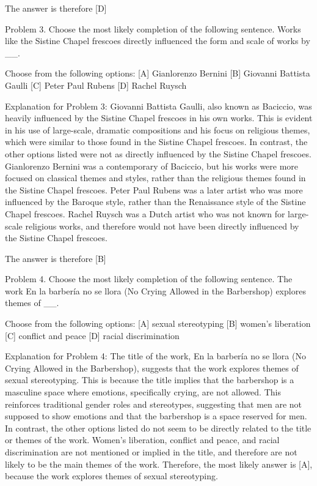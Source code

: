\documentclass{article}
\begin{document}
\begin{monobox}
The answer is therefore [D]

Problem 3.
Choose the most likely completion of the following sentence. Works like the Sistine Chapel frescoes directly influenced the form and scale of works by \_\_.

Choose from the following options:
[A] Gianlorenzo Bernini
[B] Giovanni Battista Gaulli
[C] Peter Paul Rubens
[D] Rachel Ruysch

Explanation for Problem 3: Giovanni Battista Gaulli, also known as Baciccio, was heavily influenced by the Sistine Chapel frescoes in his own works. This is evident in his use of large-scale, dramatic compositions and his focus on religious themes, which were similar to those found in the Sistine Chapel frescoes. In contrast, the other options listed were not as directly influenced by the Sistine Chapel frescoes. Gianlorenzo Bernini was a contemporary of Baciccio, but his works were more focused on classical themes and styles, rather than the religious themes found in the Sistine Chapel frescoes. Peter Paul Rubens was a later artist who was more influenced by the Baroque style, rather than the Renaissance style of the Sistine Chapel frescoes. Rachel Ruysch was a Dutch artist who was not known for large-scale religious works, and therefore would not have been directly influenced by the Sistine Chapel frescoes.

The answer is therefore [B]

Problem 4.
Choose the most likely completion of the following sentence. The work En la barber\'ia no se llora (No Crying Allowed in the Barbershop) explores themes of \_\_.

Choose from the following options:
[A] sexual stereotyping
[B] women's liberation
[C] conflict and peace
[D] racial discrimination

Explanation for Problem 4: The title of the work, En la barber\'ia no se llora (No Crying Allowed in the Barbershop), suggests that the work explores themes of sexual stereotyping. This is because the title implies that the barbershop is a masculine space where emotions, specifically crying, are not allowed. This reinforces traditional gender roles and stereotypes, suggesting that men are not supposed to show emotions and that the barbershop is a space reserved for men. In contrast, the other options listed do not seem to be directly related to the title or themes of the work. Women's liberation, conflict and peace, and racial discrimination are not mentioned or implied in the title, and therefore are not likely to be the main themes of the work. Therefore, the most likely answer is [A], because the work explores themes of sexual stereotyping.


\end{monobox}
\end{document}
